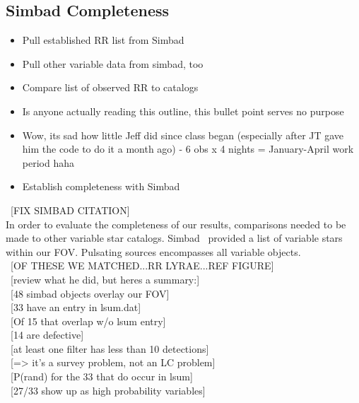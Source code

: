 \documentclass[aps,prb,twocolumn,superscriptaddress]{revtex4-1}
\begin{document}
\subsection{Simbad Completeness}
	\begin{itemize}
		\item{} Pull established RR list from Simbad
		\item{} Pull other variable data from simbad, too
		\item{} Compare list of observed RR to catalogs
		\item{} Is anyone actually reading this outline, this bullet point serves no purpose
		\item{} Wow, its sad how little Jeff did since class began (especially after JT gave him the code to do it a month ago) - 6 obs x 4 nights = January-April work period haha
		\item{} Establish completeness with Simbad
	\end{itemize}
~[FIX SIMBAD CITATION]\\
In order to evaluate the completeness of our results, comparisons needed to be made to other variable star catalogs.  Simbad~\cite{simbad} provided a list of variable stars within our FOV.  Pulsating sources encompasses all variable objects.  \\
~[OF THESE WE MATCHED...RR LYRAE...REF FIGURE]\\


~[review what he did, but heres a summary:]\\
~[48 simbad objects overlay our FOV]\\
~[33 have an entry in lsum.dat]\\
~[Of 15 that overlap w/o lsum entry]\\
~[14 are defective]\\
~[at least one filter has less than 10 detections]\\
~[=> it's a survey problem, not an LC problem]\\
~[P(rand) for the 33 that do occur in lsum]\\
~[27/33 show up as high probability variables]\\
\end{document}
